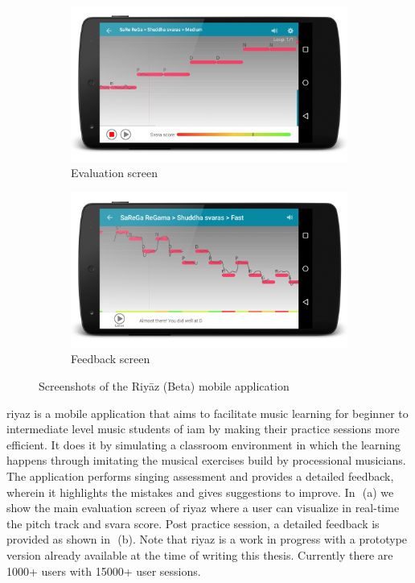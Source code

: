 \begin{figure}
	\begin{subfigure}{\textwidth}
			\centering
		\includegraphics[width=\figSizeSeventy]{ch08_applications/figures/riyaz1.png}
		\caption{Evaluation screen}
		\label{fig:riyaz_evaluation_screen}
	\end{subfigure}
	\begin{subfigure}{\textwidth}
			\centering
		\includegraphics[width=\figSizeSeventy]{ch08_applications/figures/riyaz2.png}
		\caption{Feedback screen}
		\label{fig:riyaz_feedback_screen}
	\end{subfigure}
	\caption{Screenshots of the Riy\={a}z (Beta) mobile application}
	\label{fig:riyaz_screens}
\end{figure}

\gls{riyaz} is a mobile application that aims to facilitate music learning for beginner to intermediate level music students of \gls{iam} by making their practice sessions more efficient. It does it by simulating a classroom environment in which the learning happens through imitating the musical exercises build by processional musicians. The application performs singing assessment and provides a detailed feedback, wherein it highlights the mistakes and gives suggestions to improve. In~\,(a) we show the main evaluation screen of \gls{riyaz} where a user can visualize in real-time the pitch track and \gls{svara} score. Post practice session, a detailed feedback is provided as shown in~\,(b).  Note that \gls{riyaz} is a work in progress with a prototype version already available at the time of writing this thesis. Currently there are 1000+ users with 15000+ user sessions. 





